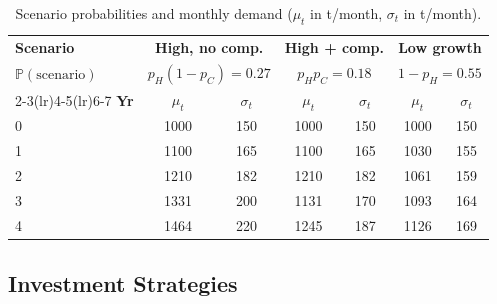 \documentclass[10pt,a4paper]{article}
\newcommand{\Prob}{\mathbb{P}}
\begin{document}
\begin{table}[H]
    \centering
    \caption{Scenario probabilities and monthly demand ($\mu_t$ in t/month, $\sigma_t$ in t/month).}
    \label{tab:demand}
    \small
    \begin{tabular}{@{}lcccccc@{}}
        \toprule
        \textbf{Scenario}        & \multicolumn{2}{c}{\textbf{High, no comp.}} & \multicolumn{2}{c}{\textbf{High + comp.}} & \multicolumn{2}{c}{\textbf{Low growth}}                                     \\
        $\Prob(\text{scenario})$ & \multicolumn{2}{c}{$p_H(1-p_C) = 0.27$}     & \multicolumn{2}{c}{$p_H p_C = 0.18$}      & \multicolumn{2}{c}{$1-p_H = 0.55$}                                          \\
        \cmidrule(lr){2-3}\cmidrule(lr){4-5}\cmidrule(lr){6-7}
        \textbf{Yr}              & $\mu_t$                                     & $\sigma_t$                                & $\mu_t$                                 & $\sigma_t$ & $\mu_t$ & $\sigma_t$ \\
        \midrule
        0                        & 1000                                        & 150                                       & 1000                                    & 150        & 1000    & 150        \\
        1                        & 1100                                        & 165                                       & 1100                                    & 165        & 1030    & 155        \\
        2                        & 1210                                        & 182                                       & 1210                                    & 182        & 1061    & 159        \\
        3                        & 1331                                        & 200                                       & 1131                                    & 170        & 1093    & 164        \\
        4                        & 1464                                        & 220                                       & 1245                                    & 187        & 1126    & 169        \\
        \bottomrule
    \end{tabular}
\end{table}

\subsection{Investment Strategies}
\label{sec:strategies}
\end{document}
